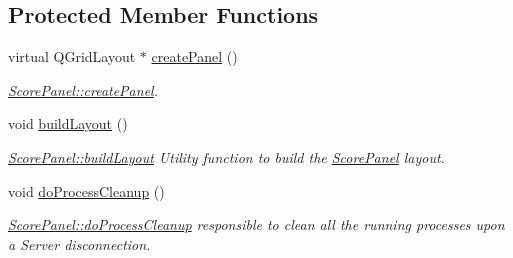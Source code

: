 \subsection*{Protected Member Functions}
\begin{DoxyCompactItemize}
\item 
virtual Q\+Grid\+Layout $\ast$ \mbox{\hyperlink{classScorePanel_aae4f1b7b8ee1afc61ac53105f8657fdb}{create\+Panel}} ()
\begin{DoxyCompactList}\small\item\em \mbox{\hyperlink{classScorePanel_aae4f1b7b8ee1afc61ac53105f8657fdb}{Score\+Panel\+::create\+Panel}}. \end{DoxyCompactList}\item 
\mbox{\label{classScorePanel_aec69374bc8b6c5b7db92f59b6f56b097}} 
void \mbox{\hyperlink{classScorePanel_aec69374bc8b6c5b7db92f59b6f56b097}{build\+Layout}} ()
\begin{DoxyCompactList}\small\item\em \mbox{\hyperlink{classScorePanel_aec69374bc8b6c5b7db92f59b6f56b097}{Score\+Panel\+::build\+Layout}} Utility function to build the \mbox{\hyperlink{classScorePanel}{Score\+Panel}} layout. \end{DoxyCompactList}\item 
\mbox{\label{classScorePanel_abffeac6985e3e7246b41f8ef7ee2fe45}} 
void \mbox{\hyperlink{classScorePanel_abffeac6985e3e7246b41f8ef7ee2fe45}{do\+Process\+Cleanup}} ()
\begin{DoxyCompactList}\small\item\em \mbox{\hyperlink{classScorePanel_abffeac6985e3e7246b41f8ef7ee2fe45}{Score\+Panel\+::do\+Process\+Cleanup}} responsible to clean all the running processes upon a Server disconnection. \end{DoxyCompactList}\end{DoxyCompactItemize}

